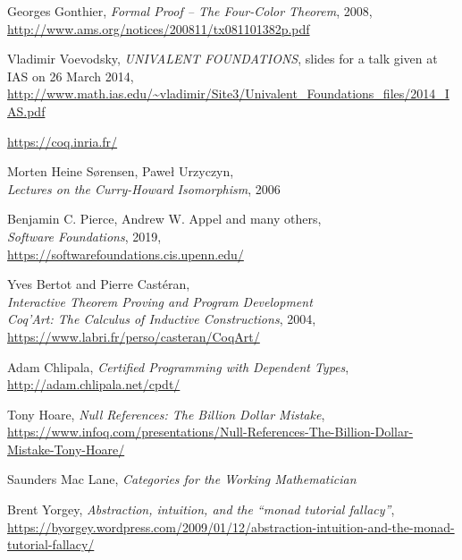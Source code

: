 \documentclass[declaration,inz,english,shortabstract]{iithesis}
\begin{document}
\begin{thebibliography}{1}
        Georges Gonthier,
        \textit{Formal Proof -- The Four-Color Theorem}, 2008, \\
        \url{http://www.ams.org/notices/200811/tx081101382p.pdf}

        Vladimir Voevodsky,
        \textit{UNIVALENT FOUNDATIONS},
        slides for a talk given at IAS on 26 March 2014, \\
        \url{http://www.math.ias.edu/~vladimir/Site3/Univalent_Foundations_files/2014_IAS.pdf}

        \url{https://coq.inria.fr/}

        Morten Heine Sørensen, Paweł Urzyczyn, \\
        \textit{Lectures on the Curry-Howard Isomorphism}, 2006
    
        Benjamin C. Pierce, Andrew W. Appel and many others, \\
        \textit{Software Foundations}, 2019, \\
        \url{https://softwarefoundations.cis.upenn.edu/}
    
        Yves Bertot and Pierre Castéran, \\
        \textit{Interactive Theorem Proving and Program Development \\ Coq'Art: The Calculus of Inductive Constructions}, 2004, \\
        \url{https://www.labri.fr/perso/casteran/CoqArt/}

        Adam Chlipala,
        \textit{Certified Programming with Dependent Types}, \\
        \url{http://adam.chlipala.net/cpdt/}

        Tony Hoare,
        \textit{Null References: The Billion Dollar Mistake}, \\
        \url{https://www.infoq.com/presentations/Null-References-The-Billion-Dollar-Mistake-Tony-Hoare/}
    
        Saunders Mac Lane,
        \textit{Categories for the Working Mathematician}

        Brent Yorgey, \textit{Abstraction, intuition, and the ``monad tutorial fallacy''}, \\
        \url{https://byorgey.wordpress.com/2009/01/12/abstraction-intuition-and-the-monad-tutorial-fallacy/}


\end{thebibliography}
\end{document}
